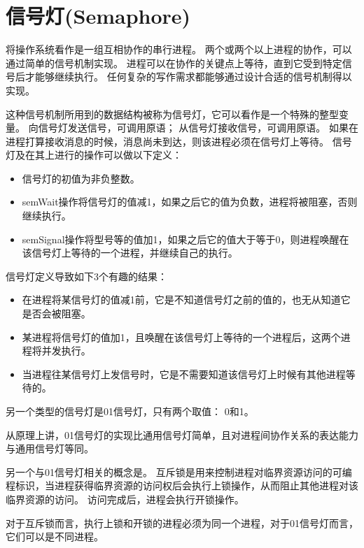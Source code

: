 
\section{信号灯(Semaphore)}
{
    将操作系统看作是一组互相协作的串行进程。
    两个或两个以上进程的协作，可以通过简单的信号机制实现。
    进程可以在协作的关键点上等待，直到它受到特定信号后才能够继续执行。
    任何复杂的写作需求都能够通过设计合适的信号机制得以实现。

    这种信号机制所用到的数据结构被称为信号灯，它可以看作是一个特殊的整型变量。
    向信号灯发送信号，可调用原语；
    从信号灯接收信号，可调用原语。
    如果在进程打算接收消息的时候，消息尚未到达，则该进程必须在信号灯上等待。
    信号灯及在其上进行的操作可以做以下定义：

    \begin{itemize}
        \item 信号灯的初值为非负整数。
        \item semWait操作将信号灯的值减1，如果之后它的值为负数，进程将被阻塞，否则继续执行。
        \item semSignal操作将型号等的值加1，如果之后它的值大于等于0，则进程唤醒在该信号灯上等待的一个进程，并继续自己的执行。
    \end{itemize}

    信号灯定义导致如下3个有趣的结果：

    \begin{itemize}
        \item 在进程将某信号灯的值减1前，它是不知道信号灯之前的值的，也无从知道它是否会被阻塞。
        \item 某进程将信号灯的值加1，且唤醒在该信号灯上等待的一个进程后，这两个进程将并发执行。
        \item 当进程往某信号灯上发信号时，它是不需要知道该信号灯上时候有其他进程等待的。
    \end{itemize}

    另一个类型的信号灯是01信号灯，只有两个取值：
    0和1。

    从原理上讲，01信号灯的实现比通用信号灯简单，且对进程间协作关系的表达能力与通用信号灯等同。

    另一个与01信号灯相关的概念是。
    互斥锁是用来控制进程对临界资源访问的可编程标识，当进程获得临界资源的访问权后会执行上锁操作，从而阻止其他进程对该临界资源的访问。
    访问完成后，进程会执行开锁操作。

    对于互斥锁而言，执行上锁和开锁的进程必须为同一个进程，对于01信号灯而言，它们可以是不同进程。

}
